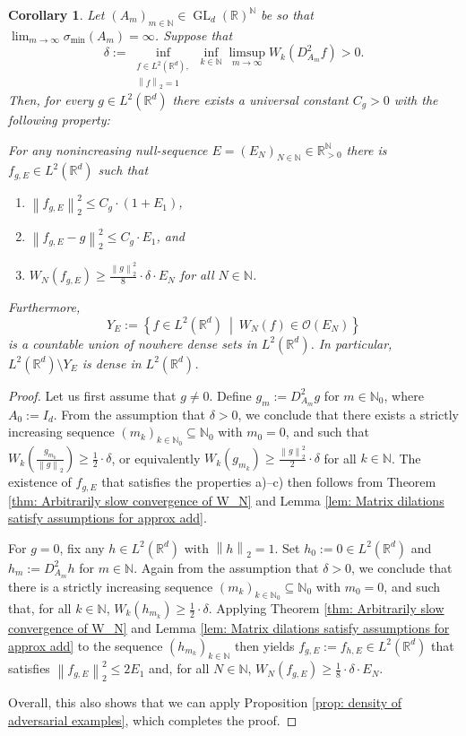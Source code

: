 \documentclass[11pt]{amsart}
\newcommand{\R}{{\mathbb{R}}}
\newcommand{\N}{\mathbb{N}}
\newcommand{\norm}[1]{\ensuremath{\left\lVert\text{}#1\text{}\right\rVert}}
\DeclareMathOperator{\GL}{GL}
\newtheorem{corollary}[theorem]{Corollary}
\newenvironment{proof sketch} {\textit{Proof sketch.}}{}
\newenvironment{myenum}
{ \begin{enumerate}
    \setlength{\itemsep}{3pt}
    \setlength{\parskip}{0pt}
    \setlength{\parsep}{0pt}     }
{ \end{enumerate}                  }
\begin{document}
  \begin{corollary}\label{cor: arbitrarily slow decay if delta is positive}
    Let $(A_m)_{m \in \N} \in \GL_d(\R)^\N$ be so that $\lim_{m \to \infty}\sigma_{\text{min}}(A_m)=\infty$. Suppose that
    \[\delta:=\inf_{\substack{f \in L^2(\R^d),\\ \norm{f}_2=1}}\inf_{k \in \N} \limsup_{m \to \infty} W_k(D_{A_m}^2f)>0.\] 
    Then, for every $g \in L^2(\R^d)$ there exists a universal constant $C_g>0$ with the following property:
    
    For any nonincreasing null-sequence $E=(E_N)_{N \in \N}\in \R_{>0}^\N$ there is $f_{g,E} \in L^2(\R^d)$ such that
    \begin{myenum}
      \item[a)] $\norm{f_{g,E}}_2^2\leq C_g \cdot (1+E_1)$,
      \item[b)] $\norm{f_{g,E}-g}_2^2\leq C_g \cdot E_1$, and
      \item[c)] $W_N(f_{g,E})\geq \frac{\norm{g}_2^2}{8} \cdot \delta \cdot E_N$ for all $N\in \N$.
    \end{myenum}
    Furthermore,
    \[Y_E:=\left\{f \in L^2(\R^d) ~\middle|~ W_N(f) \in \mathcal{O}(E_N)\right\}\]
    is a countable union of nowhere dense sets in $L^2(\R^d)$. In particular,  $L^2(\R^d) \setminus Y_E$ is dense in $L^2(\R^d)$.
  \end{corollary}
  
  \begin{proof}
    Let us first assume that $g\neq 0$. Define $g_m:=D_{A_m}^2g$ for $m \in \N_0$, where $A_0:=I_d$. From the assumption that $\delta>0$, we conclude that there exists a strictly increasing sequence $(m_k)_{k\in \N_0} \subseteq \N_0$ with $m_0=0$, and such that $W_k\left(\frac{g_{m_k}}{\norm{g}_2}\right)\geq \frac{1}{2} \cdot \delta$, or equivalently $W_k\left(g_{m_k}\right)\geq \frac{\norm{g}_2^2}{2} \cdot \delta$ for all $k \in \N$. The existence of $f_{g,E}$ that satisfies the properties a)--c) then follows from Theorem \ref{thm: Arbitrarily slow convergence of W_N} and Lemma \ref{lem: Matrix dilations satisfy assumptions for approx add}.
  
    For $g=0$, fix any $h \in L^2(\R^d)$ with $\norm{h}_2=1$. Set $h_0:=0\in L^2(\R^d)$ and $h_m:=D_{A_m}^2h$ for $m \in \N$. Again from the assumption that $\delta>0$, we conclude that there is a strictly increasing sequence $(m_k)_{k\in \N_0} \subseteq \N_0$ with $m_0=0$, and such that, for all $k \in \N$, $W_k\left(h_{m_k}\right)\geq \frac{1}{2} \cdot \delta$. Applying Theorem \ref{thm: Arbitrarily slow convergence of W_N} and Lemma \ref{lem: Matrix dilations satisfy assumptions for approx add} to the sequence $(h_{m_k})_{k \in \N}$ then yields $f_{g,E}:=f_{h,E}\in L^2(\R^d)$ that satisfies $\norm{f_{g,E}}_2^2\leq 2E_1$ and, for all $N \in \N$, $W_N(f_{g,E})\geq \frac{1}{8} \cdot \delta \cdot E_N$.
  
    Overall, this also shows that we can apply Proposition \ref{prop: density of adversarial examples}, which completes the proof. 
  \end{proof}
  
\end{document}
